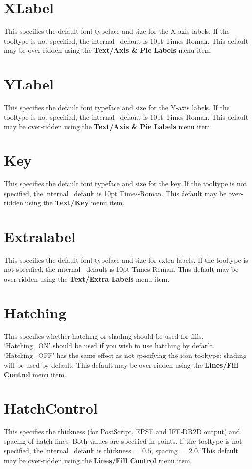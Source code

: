 \section{XLabel}
This specifies the default font typeface and size for the X-axis labels.  If the 
tooltype is not specified, the internal \amplot\ default is 10pt Times-Roman.
This default may be over-ridden using the {\bf Text/Axis \& Pie Labels} menu item.

\section{YLabel}
This specifies the default font typeface and size for the Y-axis labels.  If the 
tooltype is not specified, the internal \amplot\ default is 10pt Times-Roman.
This default may be over-ridden using the {\bf Text/Axis \& Pie Labels} menu item.

\section{Key}
This specifies the default font typeface and size for the key.  If the 
tooltype is not specified, the internal \amplot\ default is 10pt Times-Roman.
This default may be over-ridden using the {\bf Text/Key} menu item.

\section{Extralabel}
This specifies the default font typeface and size for extra labels.  If the 
tooltype is not specified, the internal \amplot\ default is 10pt Times-Roman.
This default may be over-ridden using the {\bf Text/Extra Labels} menu item.

\section{Hatching}
This specifies whether hatching or shading should be used for fills. `Hatching=ON'
should be used if you wish to use hatching by default. `Hatching=OFF' has the same 
effect as not specifying the icon tooltype: shading will be used by default.
This default may be over-ridden using the {\bf Lines/Fill Control} menu item.

\section{HatchControl}
This specifies the thickness (for PostScript, EPSF and IFF-DR2D output) and  spacing 
of hatch lines. Both values are specified in points. If the tooltype is not 
specified, the internal \amplot\ default is thickness $= 0.5$, spacing $= 2.0$.
This default may be over-ridden using the {\bf Lines/Fill Control} menu item.

